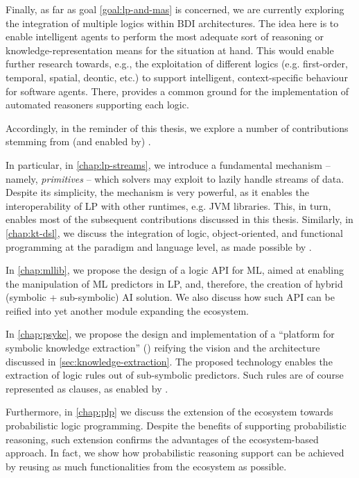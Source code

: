 \documentclass[12pt,a4paper,openright,twoside]{book}
\begin{document}
Finally, as far as goal \ref{goal:lp-and-mas} is concerned, we are currently exploring the integration of multiple logics within BDI architectures.
%
The idea here is to enable intelligent agents to perform the most adequate sort of reasoning or knowledge-representation means for the situation at hand.
%
This would enable further research towards, e.g., the exploitation of different logics (e.g. first-order, temporal, spatial, deontic, etc.) to support intelligent, context-specific behaviour for software agents.
%
There, \twopkt{} provides a common ground for the implementation of automated reasoners supporting each logic.

\emptyparagraph

Accordingly, in the reminder of this thesis, we explore a number of contributions stemming from (and enabled by) \twopkt{}.

In particular, in \cref{chap:lp-streams}, we introduce a fundamental mechanism -- namely, \emph{primitives} -- which \twopkt{} solvers may exploit to lazily handle streams of data.
%
Despite its simplicity, the mechanism is very powerful, as it enables the interoperability of LP with other runtimes, e.g. JVM libraries.
%
This, in turn, enables most of the subsequent contributions discussed in this thesis.
%
Similarly, in \cref{chap:kt-dsl}, we discuss the integration of logic, object-oriented, and functional programming at the paradigm and language level, as made possible by \twopkt{}.

In \cref{chap:mllib}, we propose the design of a logic API for ML, aimed at enabling the manipulation of ML predictors in LP, and, therefore, the creation of hybrid (symbolic + sub-symbolic) AI solution.
%
We also discuss how such API can be reified into yet another module expanding the \twopkt{} ecosystem.

In \cref{chap:psyke}, we propose the design and implementation of a ``platform for symbolic knowledge extraction'' (\psyke{}) reifying the vision and the architecture discussed in \cref{sec:knowledge-extraction}.
%
The proposed technology enables the extraction of logic rules out of sub-symbolic predictors.
%
Such rules are of course represented as clauses, as enabled by \twopkt{}.

Furthermore, in \cref{chap:plp} we discuss the extension of the \twopkt{} ecosystem towards probabilistic logic programming.
%
Despite the benefits of supporting probabilistic reasoning, such extension confirms the advantages of the ecosystem-based approach.
%
In fact, we show how probabilistic reasoning support can be achieved by reusing as much functionalities from the \twopkt{} ecosystem as possible.
\end{document}
